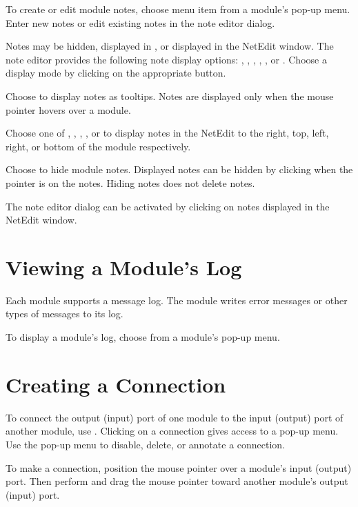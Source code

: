 To create or edit module notes, choose menu item  from
a module's pop-up menu. Enter new notes or edit existing notes in
the note editor dialog.

Notes may be hidden, displayed in , or displayed in the
NetEdit window.  The note editor provides the following note display
options: , , ,
, , or .  Choose a
display mode by clicking  on the appropriate button.

Choose  to display notes as tooltips.  Notes are
displayed only when the mouse pointer hovers over a module.

Choose one of , , ,
, or  to display notes in the
NetEdit to the right, top, left, right, or bottom of the module
respectively. 

Choose  to hide module notes.  Displayed notes can be
hidden by clicking  when the pointer is on the
notes.  Hiding notes does not delete notes.

The note editor dialog can be activated by clicking 
on notes displayed in the NetEdit window.


\section{Viewing a Module's Log}
\label{sec:viewmodslog}

Each module supports a message log. The module writes error messages
or other types of messages to its log.

To display a module's log, choose  from a module's
pop-up menu.


\section{Creating a Connection}
\label{sec:connectmods}

To connect the output (input) port of one module to the input (output)
port of another module, use . Clicking
 on a connection gives access to a pop-up menu. Use
the pop-up menu to disable, delete, or annotate a connection.

To make a connection, position the mouse pointer over a module's input
(output) port.  Then perform  and drag the
mouse pointer toward another module's output (input) port.

